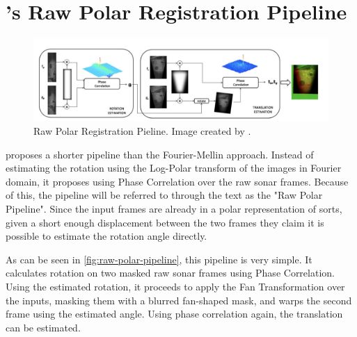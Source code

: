 \section{\citeauthor{Hurtos2015}'s Raw Polar Registration Pipeline}

\begin{figure}[H]
  \centering
  \includegraphics[width=\textwidth]{figures/RawPolarPipeline.png}
  \caption{Raw Polar Registration Pieline. Image created by \citeauthor{Hurtos2015}\cite{Hurtos2015}.}
  \label{fig:raw-polar-pipeline}
\end{figure}


\citeauthor{Hurtos2015} proposes a shorter pipeline than the Fourier-Mellin approach. Instead of estimating the rotation using the Log-Polar transform of the images in Fourier domain, it proposes using Phase Correlation over the raw sonar frames. Because of this, the pipeline will be referred to through the text as the "Raw Polar Pipeline". Since the input frames are already in a polar representation of sorts, given a short enough displacement between the two frames they claim it is possible to estimate the rotation angle directly.

As can be seen in \autoref{fig:raw-polar-pipeline}, this pipeline is very simple. It calculates rotation on two masked raw sonar frames using Phase Correlation. Using the estimated rotation, it proceeds to apply the Fan Transformation over the inputs, masking them with a blurred fan-shaped mask, and warps the second frame using the estimated angle. Using phase correlation again, the translation can be estimated.